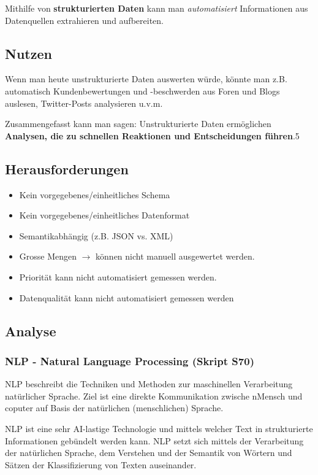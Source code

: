 \documentclass[a4paper, 11pt]{article}
\begin{document}
Mithilfe von \textbf{strukturierten Daten} kann man \textit{automatisiert} Informationen aus Datenquellen extrahieren und aufbereiten.

\subsection{Nutzen}

\noindent Wenn man heute unstrukturierte Daten auswerten würde, könnte man z.B. automatisch Kundenbewertungen und -beschwerden aus Foren und Blogs auslesen, Twitter-Posts analysieren u.v.m. 

Zusammengefasst kann man sagen: Unstrukturierte Daten ermöglichen \textbf{Analysen, die zu schnellen Reaktionen und Entscheidungen führen}.5

\subsection{Herausforderungen}

\begin{itemize}
	\item Kein vorgegebenes/einheitliches Schema
	\item Kein vorgegebenes/einheitliches Datenformat
	\item Semantikabhängig (z.B. JSON vs. XML)
	\item Grosse Mengen $\rightarrow$ können nicht manuell ausgewertet werden.
	\item Priorität kann nicht automatisiert gemessen werden.
	\item Datenqualität kann nicht automatisiert gemessen werden
\end{itemize}

\subsection{Analyse}

\subsubsection{NLP - Natural Language Processing (Skript S70)}
 NLP beschreibt die Techniken und Methoden zur maschinellen Verarbeitung natürlicher Sprache. Ziel ist eine direkte Kommunikation zwische nMensch und coputer auf Basis der natürlichen (menschlichen) Sprache.

NLP ist eine sehr AI-lastige Technologie und mittels welcher Text in strukturierte Informationen gebündelt werden kann. NLP setzt sich mittels der Verarbeitung der natürlichen Sprache, dem Verstehen und der Semantik von 
Wörtern und Sätzen der Klassifizierung von Texten auseinander.
\end{document}
